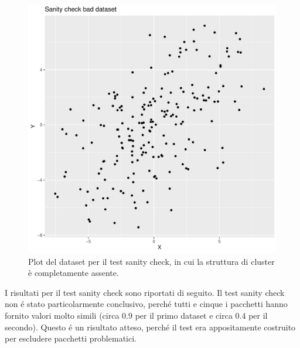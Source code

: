 \documentclass[italian]{article}
\begin{document}
			\begin{figure}[h]
				\includegraphics[width = \textwidth]{doc/sc_dataset_bad.pdf}
				\caption{Plot del dataset per il test sanity check, in cui
				la struttura di cluster è completamente assente.}
				\label{fig:scbad}
			\end{figure}

			I risultati per il test sanity check sono riportati di seguito.
			Il test sanity check non é stato particolarmente conclusivo,
			perché tutti e cinque i pacchetti hanno fornito valori molto
			simili (circa $0.9$ per il primo dataset e circa $0.4$ per il
			secondo). Questo é un risultato atteso, perché il test era
			appositamente costruito per escludere pacchetti problematici.
\end{document}
